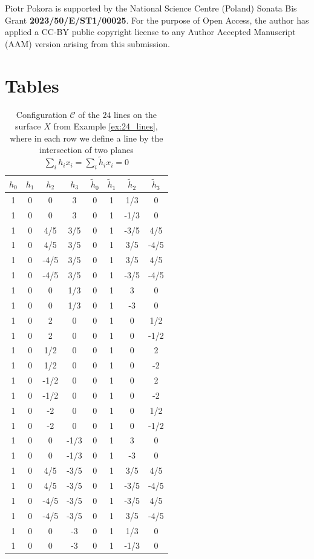 \documentclass{article}
\theoremstyle{plain}
\theoremstyle{definition}
\numberwithin{equation}{section}
\begin{document}
\begin{funding}
Piotr Pokora is supported by the National Science Centre (Poland) Sonata Bis Grant  \textbf{2023/50/E/ST1/00025}. For the purpose of Open Access, the author has applied a CC-BY public copyright license to any Author Accepted Manuscript (AAM) version arising from this submission.
\end{funding}
\newpage
\section{Tables}
    \begin{table}[htb]
    \begin{tabular}{cccc|cccc}
    $h_{0}$ & $h_{1}$ & $h_{2}$ & $h_{3}$ & $\widetilde{h}_{0}$ & $\widetilde{h}_{1}$ & $\widetilde{h}_{2}$ & $\widetilde{h}_{3}$ \\
    \hline\hline
    1 & 0 & 0 & 3 & 0 & 1 & 1/3 & 0\\
1 & 0 & 0 & 3 & 0 & 1 & -1/3 & 0\\
1 & 0 & 4/5 & 3/5 & 0 & 1 & -3/5 & 4/5\\
1 & 0 & 4/5 & 3/5 & 0 & 1 & 3/5 & -4/5\\
1 & 0 & -4/5 & 3/5 & 0 & 1 & 3/5 & 4/5\\
1 & 0 & -4/5 & 3/5 & 0 & 1 & -3/5 & -4/5\\
1 & 0 & 0 & 1/3 & 0 & 1 & 3 & 0\\
1 & 0 & 0 & 1/3 & 0 & 1 & -3 & 0\\
1 & 0 & 2 & 0 & 0 & 1 & 0 & 1/2\\
1 & 0 & 2 & 0 & 0 & 1 & 0 & -1/2\\
1 & 0 & 1/2 & 0 & 0 & 1 & 0 & 2\\
1 & 0 & 1/2 & 0 & 0 & 1 & 0 & -2\\
1 & 0 & -1/2 & 0 & 0 & 1 & 0 & 2\\
1 & 0 & -1/2 & 0 & 0 & 1 & 0 & -2\\
1 & 0 & -2 & 0 & 0 & 1 & 0 & 1/2\\
1 & 0 & -2 & 0 & 0 & 1 & 0 & -1/2\\
1 & 0 & 0 & -1/3 & 0 & 1 & 3 & 0\\
1 & 0 & 0 & -1/3 & 0 & 1 & -3 & 0\\
1 & 0 & 4/5 & -3/5 & 0 & 1 & 3/5 & 4/5\\
1 & 0 & 4/5 & -3/5 & 0 & 1 & -3/5 & -4/5\\
1 & 0 & -4/5 & -3/5 & 0 & 1 & -3/5 & 4/5\\
1 & 0 & -4/5 & -3/5 & 0 & 1 & 3/5 & -4/5\\
1 & 0 & 0 & -3 & 0 & 1 & 1/3 & 0\\
1 & 0 & 0 & -3 & 0 & 1 & -1/3 & 0 
    \end{tabular}
    \caption{Configuration $\mathcal{C}$ of the $24$ lines on the surface $X$ from Example \ref{ex:24_lines}, where in each row we define a line by the intersection of two planes $\sum_{i}h_{i}x_i=\sum_{i}\widetilde{h}_{i}x_i=0$}\label{tab:24_lines}
\end{table}
\end{document}
